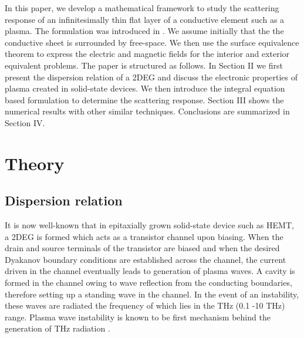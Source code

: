 \documentclass{ieeeaccess}
\renewcommand{\^}{\hat}  %
\begin{document}
In this paper, we develop a mathematical framework to study the scattering response of an infinitesimally thin flat layer of a conductive element such as a plasma. The formulation was introduced in  \cite{abbas2017integral,abbas2018electromagnetic}. We assume initially that the the conductive sheet is surrounded by free-space. We then use the surface equivalence theorem to express the electric and magnetic fields for the interior and exterior equivalent problems. The paper is structured as follows. In Section II we first present the dispersion relation of a 2DEG and discuss the electronic properties of plasma created in solid-state devices. We then introduce the integral equation based formulation to determine the scattering response. Section III shows the numerical results with other similar techniques. Conclusions are summarized in Section IV. 

\section{Theory}
\subsection{Dispersion relation}
% 
It is now well-known that in epitaxially grown solid-state device  such as HEMT, a 2DEG is formed which acts as a transistor channel upon biasing. When the drain and source terminals of the transistor are biased and when the desired Dyakanov boundary conditions \cite{Dyakonov1993,Dyakonov1996} are established across the channel, the current driven in the channel eventually leads to generation of plasma waves. A cavity is formed in the channel owing to wave reflection from the conducting boundaries, therefore setting up a standing wave in the channel. In the event of an instability, these waves are radiated the frequency of which lies in the THz (0.1 -10 THz) range. Plasma wave instability is known to be first mechanism behind the generation of THz radiation \cite{Fatimy2010,Popov2003,Dyakonov2001}.
\end{document}
